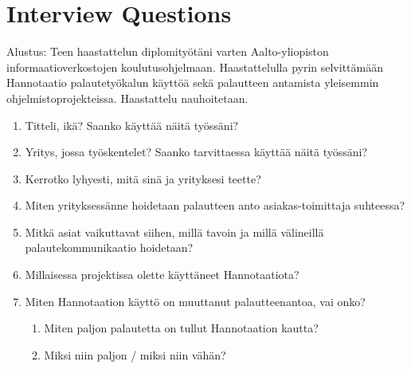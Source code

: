 \documentclass[english,12pt,a4paper,pdftex]{article}
\begin{document}



\appendix 

\clearpage

\section{Interview Questions\label{appendix:interview_questions}}

Alustus: Teen haastattelun diplomityötäni varten Aalto-yliopiston informaatioverkostojen koulutusohjelmaan. Haastattelulla pyrin selvittämään Hannotaatio palautetyökalun käyttöä sekä palautteen antamista yleisemmin ohjelmistoprojekteissa. Haastattelu nauhoitetaan. 

\begin{enumerate}

\item Titteli, ikä? Saanko käyttää näitä työssäni?

\item Yritys, jossa työskentelet? Saanko tarvittaessa käyttää näitä työssäni?

\item Kerrotko lyhyesti, mitä sinä ja yrityksesi teette?

\item Miten yrityksessänne hoidetaan palautteen anto asiakas-toimittaja suhteessa?

\item Mitkä asiat vaikuttavat siihen, millä tavoin ja millä välineillä palautekommunikaatio hoidetaan?

\item Millaisessa projektissa olette käyttäneet Hannotaatiota?

\item Miten Hannotaation käyttö on muuttanut palautteenantoa, vai onko?
  \begin{enumerate}
    \item Miten paljon palautetta on tullut Hannotaation kautta?
    \item Miksi niin paljon / miksi niin vähän?
  \end{enumerate}



\end{enumerate}
\end{document}
